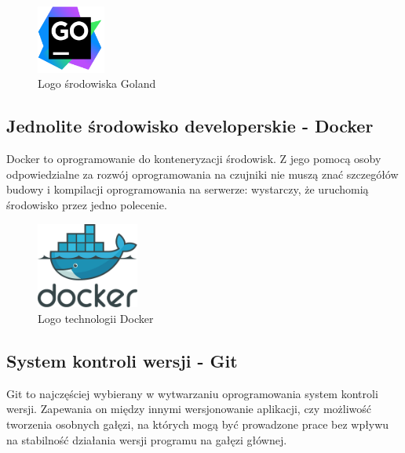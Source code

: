 \documentclass[12pt,oneside,a4paper]{book}
\theoremstyle{break}
\begin{document}
\begin{figure}[H]
    \begin{center}
        \includegraphics[width=0.2\textwidth]{goland_logo.png}        
        \caption{Logo środowiska Goland}        
    \end{center}
\end{figure}

\subsection{Jednolite środowisko developerskie - Docker}
Docker to oprogramowanie do konteneryzacji środowisk. Z jego pomocą
osoby odpowiedzialne za rozwój oprogramowania na czujniki nie muszą
znać szczegółów budowy i kompilacji oprogramowania na serwerze:
wystarczy, że uruchomią środowisko przez jedno polecenie. 
\cite{docker-compose-doc}
\cite{docker-book}

\begin{figure}[H]
    \begin{center}
        \includegraphics[width=0.3\textwidth]{logo_docker.png}        
        \caption{Logo technologii Docker}        
        \label{rys:logo-docker}
    \end{center}
\end{figure}

\subsection{System kontroli wersji - Git}
Git to najczęściej wybierany w wytwarzaniu oprogramowania system
kontroli wersji. Zapewania on między innymi wersjonowanie aplikacji,
czy możliwość 
tworzenia osobnych gałęzi, na których mogą być prowadzone prace 
bez wpływu na stabilność działania wersji programu na gałęzi głównej.
\cite{git-doc}
\cite{git-free-book}
\cite{git-book}
\end{document}
